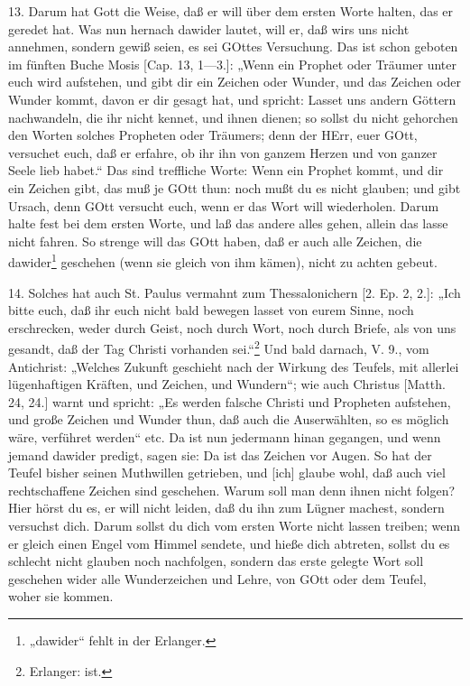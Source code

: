 13. Darum hat Gott die Weise, daß er will über dem ersten Worte halten, das er geredet hat.
Was nun hernach dawider lautet, will er, daß wirs uns nicht annehmen, sondern gewiß seien, es sei GOttes Versuchung. Das ist schon geboten im fünften Buche Mosis [Cap. 13, 1—3.]: „Wenn ein Prophet oder Träumer unter euch wird aufstehen, und gibt dir ein Zeichen oder Wunder, und das Zeichen oder Wunder kommt, davon er dir gesagt hat, und spricht: Lasset uns andern Göttern nachwandeln, die ihr nicht kennet, und ihnen dienen; so sollst du nicht gehorchen den Worten solches Propheten oder Träumers; denn der HErr, euer GOtt, versuchet euch, daß er erfahre, ob ihr ihn von ganzem Herzen und von ganzer Seele lieb habet.“ Das sind treffliche Worte: Wenn ein Prophet kommt, und dir ein Zeichen gibt, das muß je GOtt thun: noch mußt du es nicht glauben; und gibt Ursach, denn GOtt versucht euch, wenn er das Wort will wiederholen. Darum halte fest bei dem ersten Worte, und laß das andere alles gehen, allein das lasse nicht fahren. So strenge will das GOtt haben, daß er auch alle Zeichen, die dawider\footnote{„dawider“ fehlt in der Erlanger.} geschehen (wenn sie gleich von ihm kämen), nicht zu achten gebeut.

14. Solches hat auch St. Paulus vermahnt zum Thessalonichern [2. Ep. 2, 2.]: „Ich bitte euch, daß ihr euch nicht bald bewegen lasset von eurem Sinne, noch erschrecken, weder durch Geist, noch durch Wort, noch durch Briefe, als von uns gesandt, daß der Tag Christi vorhanden sei.“\footnote{Erlanger: ist.} Und bald darnach, V. 9., vom Antichrist: „Welches Zukunft geschieht nach der Wirkung des Teufels, mit allerlei lügenhaftigen Kräften, und Zeichen, und Wundern“; wie auch Christus [Matth. 24, 24.] warnt und spricht: „Es werden falsche Christi und Propheten aufstehen, und große Zeichen und Wunder thun, daß auch die Auserwählten, so es möglich wäre, verführet werden“ etc. Da ist nun jedermann hinan gegangen, und wenn jemand dawider predigt, sagen sie: Da ist das Zeichen vor Augen. So hat der Teufel bisher seinen Muthwillen getrieben, und [ich] glaube wohl, daß auch viel rechtschaffene Zeichen sind geschehen. Warum soll man denn ihnen nicht folgen? Hier hörst du es, er will nicht leiden, daß du ihn zum Lügner machest, sondern versuchst dich. Darum sollst du dich vom ersten Worte nicht lassen treiben; wenn er gleich einen Engel vom Himmel sendete, und hieße dich abtreten, sollst du es schlecht nicht glauben noch nachfolgen, sondern das erste gelegte Wort soll geschehen wider alle Wunderzeichen und Lehre, von GOtt oder dem Teufel, woher sie kommen.

